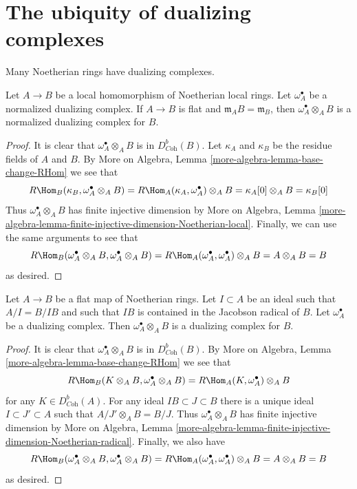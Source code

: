\section{The ubiquity of dualizing complexes}
\label{section-ubiquity-dualizing}

\noindent
Many Noetherian rings have dualizing complexes.

\begin{lemma}
\label{lemma-flat-unramified}
Let $A \to B$ be a local homomorphism of Noetherian local rings.
Let $\omega_A^\bullet$ be a normalized dualizing complex.
If $A \to B$ is flat and $\mathfrak m_A B = \mathfrak m_B$,
then $\omega_A^\bullet \otimes_A B$ is a normalized dualizing
complex for $B$.
\end{lemma}

\begin{proof}
It is clear that $\omega_A^\bullet \otimes_A B$ is in $D^b_{\textit{Coh}}(B)$.
Let $\kappa_A$ and $\kappa_B$ be the residue fields of $A$ and $B$.
By More on Algebra, Lemma \ref{more-algebra-lemma-base-change-RHom}
we see that
$$
R\Hom_B(\kappa_B, \omega_A^\bullet \otimes_A B) =
R\Hom_A(\kappa_A, \omega_A^\bullet) \otimes_A B =
\kappa_A[0] \otimes_A B = \kappa_B[0]
$$
Thus $\omega_A^\bullet \otimes_A B$ has finite injective dimension by
More on Algebra, Lemma
\ref{more-algebra-lemma-finite-injective-dimension-Noetherian-local}.
Finally, we can use the same arguments to see that
$$
R\Hom_B(\omega_A^\bullet \otimes_A B, \omega_A^\bullet \otimes_A B) =
R\Hom_A(\omega_A^\bullet, \omega_A^\bullet) \otimes_A B = A \otimes_A B = B
$$
as desired.
\end{proof}

\begin{lemma}
\label{lemma-flat-iso-mod-I}
Let $A \to B$ be a flat map of Noetherian rings. Let
$I \subset A$ be an ideal such that $A/I = B/IB$ and
such that $IB$ is contained in the Jacobson radical of $B$.
Let $\omega_A^\bullet$ be a dualizing complex.
Then $\omega_A^\bullet \otimes_A B$ is a dualizing
complex for $B$.
\end{lemma}

\begin{proof}
It is clear that $\omega_A^\bullet \otimes_A B$ is in $D^b_{\textit{Coh}}(B)$.
By More on Algebra, Lemma \ref{more-algebra-lemma-base-change-RHom}
we see that
$$
R\Hom_B(K \otimes_A B, \omega_A^\bullet \otimes_A B) =
R\Hom_A(K, \omega_A^\bullet) \otimes_A B
$$
for any $K \in D^b_{\textit{Coh}}(A)$. For any ideal
$IB \subset J \subset B$ there is a unique ideal $I \subset J' \subset A$
such that $A/J' \otimes_A B = B/J$. Thus $\omega_A^\bullet \otimes_A B$
has finite injective dimension by
More on Algebra, Lemma
\ref{more-algebra-lemma-finite-injective-dimension-Noetherian-radical}.
Finally, we also have
$$
R\Hom_B(\omega_A^\bullet \otimes_A B, \omega_A^\bullet \otimes_A B) =
R\Hom_A(\omega_A^\bullet, \omega_A^\bullet) \otimes_A B = A \otimes_A B = B
$$
as desired.
\end{proof}

